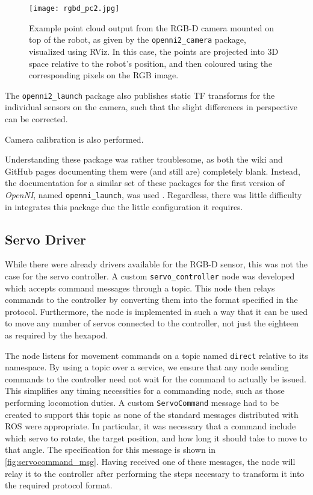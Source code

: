 \begin{figure}[!h]
    \centering
    \texttt{[image: rgbd\_pc2.jpg]}
    \caption{Example point cloud output from the RGB-D camera mounted on top of the robot, as given by the \texttt{openni2\_camera} package, visualized using RViz. In this case, the points are projected into 3D space relative to the robot's position, and then coloured using the corresponding pixels on the RGB image.}
    \label{fig:rgbd_images2}
\end{figure}

The \texttt{openni2\_launch} package also publishes static TF transforms for the individual sensors on the camera, such that the slight differences in perspective can be corrected.

Camera calibration is also performed.

Understanding these package was rather troublesome, as both the wiki and GitHub pages documenting them were (and still are) completely blank. Instead, the documentation for a similar set of these packages for the first version of \emph{OpenNI}, named \texttt{openni\_launch}, was used \cite{ros_wiki_openni_launch}. Regardless, there was little difficulty in integrates this package due the little configuration it requires.

\subsection{Servo Driver}

While there were already drivers available for the RGB-D sensor, this was not the case for the servo controller. A custom \texttt{servo\_controller} node was developed which accepts command messages through a topic. This node then relays commands to the controller by converting them into the format specified in the protocol. Furthermore, the node is implemented in such a way that it can be used to move any number of servos connected to the controller, not just the eighteen as required by the hexapod.

The node listens for movement commands on a topic named \texttt{direct} relative to its namespace. By using a topic over a service, we ensure that any node sending commands to the controller need not wait for the command to actually be issued. This simplifies any timing necessities for a commanding node, such as those performing locomotion duties. A custom \texttt{ServoCommand} message had to be created to support this topic as none of the standard messages distributed with ROS were appropriate. In particular, it was necessary that a command include which servo to rotate, the target position, and how long it should take to move to that angle. The specification for this message is shown in \autoref{fig:servocommand_msg}. Having received one of these messages, the node will relay it to the controller after performing the steps necessary to transform it into the required protocol format.

